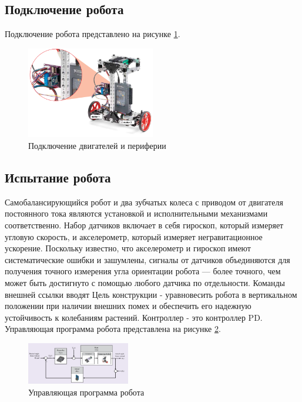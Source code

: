 \newpage
\subsection{Подключение робота}
Подключение робота представлено на рисунке \ref{3connect}.
\begin{figure}[h]
    \centering
    \includegraphics[width=0.5\textwidth]{fig/assembly/3.7.png}
    \caption{Подключение двигателей и периферии}
    \label{3connect}
\end{figure}

\subsection{Испытание робота}
Самобалансирующийся робот и два зубчатых колеса с приводом от двигателя постоянного тока являются установкой и исполнительными механизмами соответственно. Набор датчиков
включает в себя гироскоп, который измеряет угловую скорость, и акселерометр, который измеряет негравитационное
ускорение. Поскольку известно, что акселерометр и гироскоп имеют систематические ошибки и зашумлены,
сигналы от датчиков объединяются для получения точного измерения угла ориентации робота —
более точного, чем может быть достигнуто с помощью любого датчика по отдельности. Команды внешней ссылки вводят
Цель конструкции - уравновесить робота в вертикальном
положении при наличии внешних помех и обеспечить его надежную устойчивость к колебаниям растений. Контроллер - это контроллер PD.
Управляющая программа робота представлена на рисунке \ref{3prog}.
\begin{figure}[h]
    \centering
    \includegraphics[width=0.4\textwidth]{fig/assembly/3.8.png}
    \caption{Управляющая программа робота}
    \label{3prog}
\end{figure}

